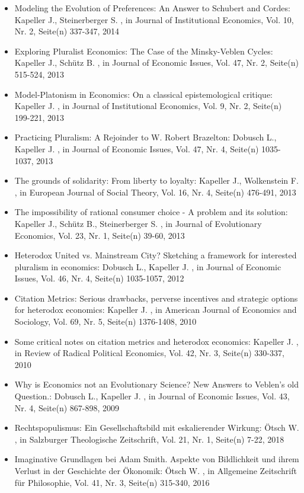 \begin{itemize}
\item Modeling the Evolution of Preferences: An Answer to Schubert and Cordes: Kapeller J., Steinerberger S. , in Journal of Institutional Economics, Vol. 10, Nr. 2, Seite(n) 337-347, 2014
\item Exploring Pluralist Economics: The Case of the Minsky-Veblen Cycles: Kapeller J., Schütz B. , in Journal of Economic Issues, Vol. 47, Nr. 2, Seite(n) 515-524, 2013
\item Model-Platonism in Economics: On a classical epistemological critique: Kapeller J. , in Journal of Institutional Economics, Vol. 9, Nr. 2, Seite(n) 199-221, 2013
\item Practicing Pluralism: A Rejoinder to W. Robert Brazelton: Dobusch L., Kapeller J. , in Journal of Economic Issues, Vol. 47, Nr. 4, Seite(n) 1035-1037, 2013
\item The grounds of solidarity: From liberty to loyalty: Kapeller J., Wolkenstein F. , in European Journal of Social Theory, Vol. 16, Nr. 4, Seite(n) 476-491, 2013
\item The impossibility of rational consumer choice - A problem and its solution: Kapeller J., Schütz B., Steinerberger S. , in Journal of Evolutionary Economics, Vol. 23, Nr. 1, Seite(n) 39-60, 2013
\item Heterodox United vs. Mainstream City? Sketching a framework for interested pluralism in economics: Dobusch L., Kapeller J. , in Journal of Economic Issues, Vol. 46, Nr. 4, Seite(n) 1035-1057, 2012
\item Citation Metrics: Serious drawbacks, perverse incentives and strategic options for heterodox economics: Kapeller J. , in American Journal of Economics and Sociology, Vol. 69, Nr. 5, Seite(n) 1376-1408, 2010
\item Some critical notes on citation metrics and heterodox economics: Kapeller J. , in Review of Radical Political Economics, Vol. 42, Nr. 3, Seite(n) 330-337, 2010
\item Why is Economics not an Evolutionary Science? New Answers to Veblen's old Question.: Dobusch L., Kapeller J. , in Journal of Economic Issues, Vol. 43, Nr. 4, Seite(n) 867-898, 2009
\item Rechtspopulismus: Ein Gesellschaftsbild mit eskalierender Wirkung: Ötsch W. , in Salzburger Theologische Zeitschrift, Vol. 21, Nr. 1, Seite(n) 7-22, 2018
\item Imaginative Grundlagen bei Adam Smith. Aspekte von Bildlichkeit und ihrem Verlust in der Geschichte der Ökonomik: Ötsch W. , in Allgemeine Zeitschrift für Philosophie, Vol. 41, Nr. 3, Seite(n) 315-340, 2016

\end{itemize}
